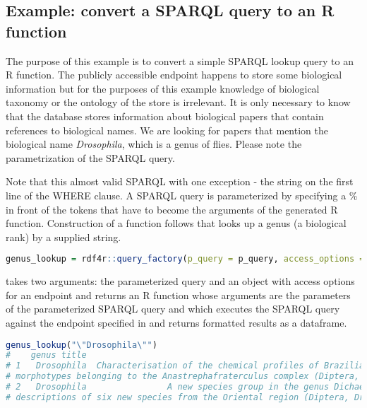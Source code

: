 \subsection{Example: convert a SPARQL query to an R function}

The purpose of this example is to convert a simple SPARQL lookup query to an R function. The publicly accessible endpoint happens to store some biological information but for the purposes of this example knowledge of biological taxonomy or the ontology of the store is irrelevant. It is only necessary to know that the database stores information about biological papers that contain references to biological names. We are looking for papers that mention the biological name \emph{Drosophila}, which is a genus of flies. Please note the parametrization of the SPARQL query.



Note that this almost valid SPARQL with one exception - the  string on the first line of the WHERE clause. A SPARQL query is parameterized by specifying a \% in front of the tokens that have to become the arguments of the generated R function. Construction of a function follows that looks up a genus (a biological rank) by a supplied string.

\begin{lstlisting}[language=R,
basicstyle=\ttfamily\tiny]
genus_lookup = rdf4r::query_factory(p_query = p_query, access_options = openbiodiv)
\end{lstlisting}

 takes two arguments: the parameterized query and an object with access options for an endpoint and returns an R function whose arguments are the parameters of the parameterized SPARQL query and which executes the SPARQL query against the endpoint specified in  and returns formatted results as a dataframe.

\begin{lstlisting}[language=R,
basicstyle=\ttfamily\tiny]
genus_lookup("\"Drosophila\"")
#    genus title
# 1   Drosophila  Characterisation of the chemical profiles of Brazilian and Andean
# morphotypes belonging to the Anastrephafraterculus complex (Diptera, Tephritidae)
# 2   Drosophila                A new species group in the genus Dichaetophora, with
# descriptions of six new species from the Oriental region (Diptera, Drosophilidae)
\end{lstlisting}

